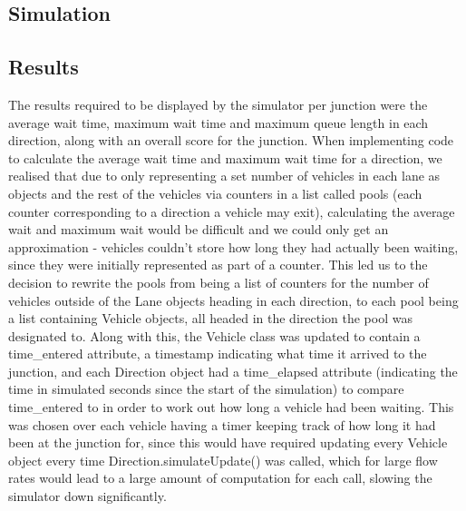 \documentclass{article}
\begin{document}
    \subsection{Simulation}

    \subsection{Results}
    The results required to be displayed by the simulator per junction were the average wait time, maximum wait time and
    maximum queue length in each direction, along with an overall score for the junction. When implementing code to
    calculate the average wait time and maximum wait time for a direction, we realised that due to only representing a
    set number of vehicles in each lane as objects and the rest of the vehicles via counters in a list called pools
    (each counter corresponding to a direction a vehicle may exit), calculating the average wait and maximum wait would
    be difficult and we could only get an approximation - vehicles couldn’t store how long they had actually been waiting,
    since they were initially represented as part of a counter. This led us to the decision to rewrite the pools from being
    a list of counters for the number of vehicles outside of the Lane objects heading in each direction, to each pool being
    a list containing Vehicle objects, all headed in the direction the pool was designated to. Along with this, the Vehicle
    class was updated to contain a time\_entered attribute, a timestamp indicating what time it arrived to the junction,
    and each Direction object had a time\_elapsed attribute (indicating the time in simulated seconds since the start of
    the simulation) to compare time\_entered to in order to work out how long a vehicle had been waiting. This was chosen
    over each vehicle having a timer keeping track of how long it had been at the junction for, since this would have
    required updating every Vehicle object every time Direction.simulateUpdate() was called, which for large flow rates
    would lead to a large amount of computation for each call, slowing the simulator down significantly.
\end{document}
